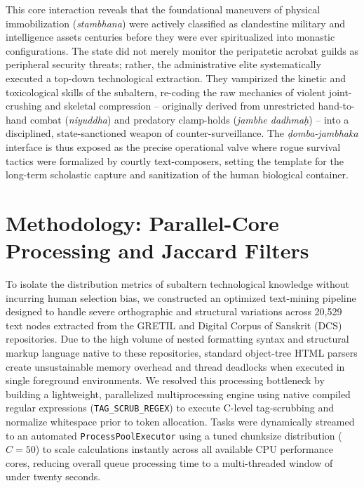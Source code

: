 \documentclass[11pt,twoside,letterpaper]{article}
\begin{document}
This core interaction reveals that the foundational maneuvers of physical immobilization (\textit{stambhana}) were actively classified as clandestine military and intelligence assets centuries before they were ever spiritualized into monastic configurations. The state did not merely monitor the peripatetic acrobat guilds as peripheral security threats; rather, the administrative elite systematically executed a top-down technological extraction. They vampirized the kinetic and toxicological skills of the subaltern, re-coding the raw mechanics of violent joint-crushing and skeletal compression – originally derived from unrestricted hand-to-hand combat (\textit{niyuddha}) and predatory clamp-holds (\textit{jambhe dadhmaḥ}) – into a disciplined, state-sanctioned weapon of counter-surveillance. The \textit{ḍomba-jambhaka} interface is thus exposed as the precise operational valve where rogue survival tactics were formalized by courtly text-composers, setting the template for the long-term scholastic capture and sanitization of the human biological container.



\section{Methodology: Parallel-Core Processing and Jaccard Filters}
\label{sec:methodology_processing_jaccard_filters}


To isolate the distribution metrics of subaltern technological knowledge without incurring human selection bias, we constructed an optimized text-mining pipeline designed to handle severe orthographic and structural variations across 20,529 text nodes extracted from the GRETIL and Digital Corpus of Sanskrit (DCS) repositories. Due to the high volume of nested formatting syntax and structural markup language native to these repositories, standard object-tree HTML parsers create unsustainable memory overhead and thread deadlocks when executed in single foreground environments. We resolved this processing bottleneck by building a lightweight, parallelized multiprocessing engine using native compiled regular expressions (\texttt{TAG\_SCRUB\_REGEX}) to execute C-level tag-scrubbing and normalize whitespace prior to token allocation. Tasks were dynamically streamed to an automated \texttt{ProcessPoolExecutor} using a tuned chunksize distribution ($C = 50$) to scale calculations instantly across all available CPU performance cores, reducing overall queue processing time to a multi-threaded window of under twenty seconds.
\end{document}
